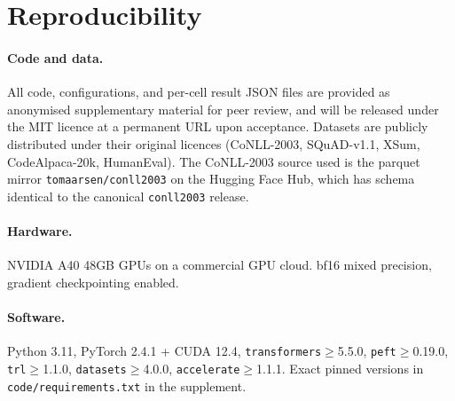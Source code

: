 \section{Reproducibility}
\label{app:repro}

\paragraph{Code and data.} All code, configurations, and per-cell result JSON files are provided as anonymised supplementary material for peer review, and will be released under the MIT licence at a permanent URL upon acceptance. Datasets are publicly distributed under their original licences (CoNLL-2003, SQuAD-v1.1, XSum, CodeAlpaca-20k, HumanEval). The CoNLL-2003 source used is the parquet mirror \texttt{tomaarsen/conll2003} on the Hugging Face Hub, which has schema identical to the canonical \texttt{conll2003} release.

\paragraph{Hardware.} NVIDIA A40 48GB GPUs on a commercial GPU cloud. bf16 mixed precision, gradient checkpointing enabled.

\paragraph{Software.} Python 3.11, PyTorch 2.4.1 + CUDA 12.4, \texttt{transformers}$\ge$5.5.0, \texttt{peft}$\ge$0.19.0, \texttt{trl}$\ge$1.1.0, \texttt{datasets}$\ge$4.0.0, \texttt{accelerate}$\ge$1.1.1. Exact pinned versions in \texttt{code/requirements.txt} in the supplement.

